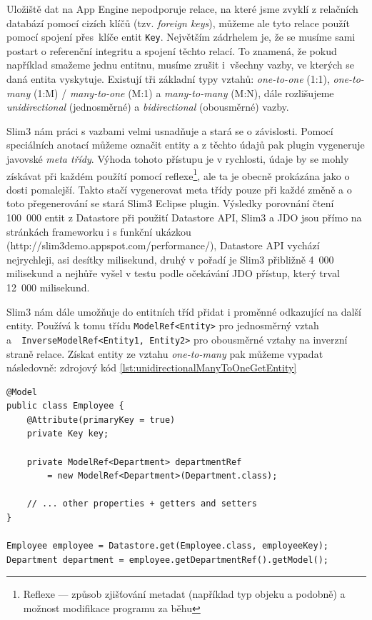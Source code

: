 Uložiště dat na App Engine nepodporuje relace, na které jsme zvyklí z relačních databází pomocí cizích klíčů (tzv. \emph{foreign keys}), můžeme ale tyto relace použít pomocí spojení přes~klíče entit \verb|Key|. Největším zádrhelem je, že se musíme sami postart o referenční integritu a spojení těchto relací. To znamená, že pokud například smažeme jednu entitnu, musíme zrušit i~všechny vazby, ve kterých se daná entita vyskytuje. Existují tři základní typy vztahů: \emph{one-to-one} (1:1), \emph{one-to-many} (1:M) / \emph{many-to-one} (M:1) a \emph{many-to-many} (M:N), dále rozlišujeme \emph{unidirectional} (jednosměrné) a \emph{bidirectional} (obousměrné) vazby. 

Slim3 nám práci s vazbami velmi usnadňuje a stará se o závislosti. Pomocí speciálních anotací můžeme označit entity a z těchto údajů pak plugin vygeneruje javovské \emph{meta třídy}. Výhoda tohoto přístupu je v rychlosti, údaje by se mohly získávat při každém použítí pomocí reflexe\footnote{Reflexe --- způsob zjišťování metadat (například typ objeku a podobně) a možnost modifikace programu za běhu}, ale ta je obecně  prokázána jako o dosti pomalejší. Takto stačí vygenerovat meta třídy pouze při každé změně a o toto přegenerování se stará Slim3 Eclipse plugin. Výsledky porovnání čtení 100~000 entit z Datastore při použití Datastore API, Slim3 a JDO jsou přímo na stránkách frameworku i s funkční ukázkou (http://slim3demo.appspot.com/performance/), Datastore API vychází nejrychleji, asi desítky milisekund, druhý v pořadí je Slim3 přibližně 4~000 milisekund a nejhůře vyšel v testu podle očekávání JDO přístup, který trval 12~000 milisekund. 

Slim3 nám dále umožňuje do entitních tříd přidat i proměnné odkazující na další entity. Používá k tomu třídu \verb|ModelRef<Entity>| pro jednosměrný vztah \\ a~\verb| InverseModelRef<Entity1, Entity2>| pro obousměrné vztahy na inverzní straně relace. Získat entity ze vztahu \emph{one-to-many} pak můžeme vypadat následovně: zdrojový kód \ref{lst:unidirectionalManyToOneGetEntity}

\begin{lstlisting}[caption={Získání entity},label=lst:unidirectionalManyToOneGetEntity,belowcaptionskip=0.4cm]
@Model
public class Employee {
	@Attribute(primaryKey = true)
	private Key key;
	
	private ModelRef<Department> departmentRef 
		= new ModelRef<Department>(Department.class);
	
	// ... other properties + getters and setters
}

Employee employee = Datastore.get(Employee.class, employeeKey);
Department department = employee.getDepartmentRef().getModel();
\end{lstlisting}


